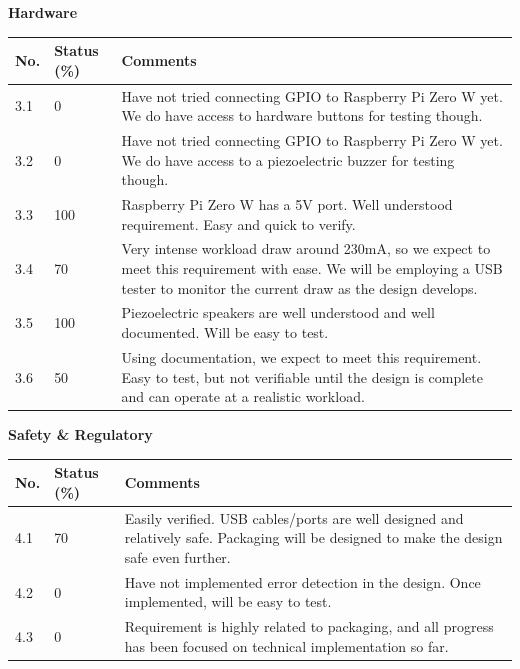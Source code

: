 \documentclass[a4paper,11pt]{article}
\begin{document}
\noindent
\textbf{Hardware}
\begin{table}[ht]
    \centering
    \begin{tabular}{|p{0.7cm}|p{1cm}|p{10cm}|}
        \hline
        No. & Status (\%) & Comments \\ \hline
        
        3.1 & 0 & Have not tried connecting GPIO to Raspberry Pi Zero W yet. We do have access to hardware buttons for testing though. \\ \hline
        
        3.2 & 0 & Have not tried connecting GPIO to Raspberry Pi Zero W yet. We do have access to a piezoelectric buzzer for testing though. \\ \hline
        
        3.3 & 100 & Raspberry Pi Zero W has a 5V port. Well understood requirement. Easy and quick to verify. \\ \hline
        
        3.4 & 70 & Very intense workload draw around 230mA, so we expect to meet this requirement with ease. We will be employing a USB tester to monitor the current draw as the design develops. \\ \hline
        
        3.5 & 100 & Piezoelectric speakers are well understood and well documented. Will be easy to test. \\ \hline
        
        3.6 & 50 & Using documentation, we expect to meet this requirement. Easy to test, but not verifiable until the design is complete and can operate at a realistic workload. \\ \hline

    \end{tabular}
\end{table}

\newpage
\noindent
\textbf{Safety \& Regulatory}
\begin{table}[ht]
    \centering
    \begin{tabular}{|p{0.7cm}|p{1cm}|p{10cm}|}
        \hline
        No. & Status (\%) & Comments \\ \hline
        
        4.1 & 70 & Easily verified. USB cables/ports are well designed and relatively safe. Packaging will be designed to make the design safe even further. \\ \hline
        
        4.2 & 0 & Have not implemented error detection in the design. Once implemented, will be easy to test. \\ \hline
        
        4.3 & 0 & Requirement is highly related to packaging, and all progress has been focused on technical implementation so far. \\ \hline

    \end{tabular}
\end{table}
\end{document}
